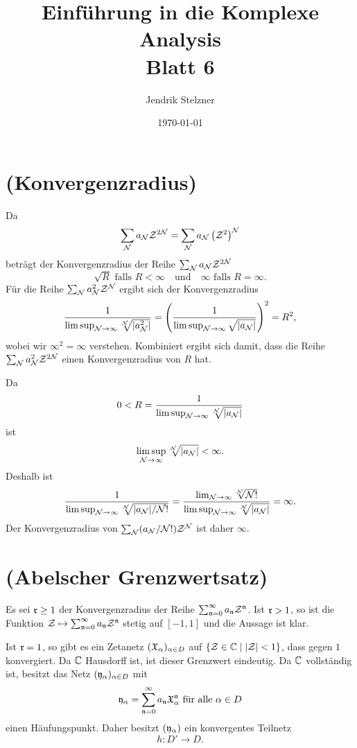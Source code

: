 \documentclass[a4paper,10pt]{article}
\title{Einführung in die Komplexe Analysis \\ \Large Blatt 6}
\author{Jendrik Stelzner}
\date{\today}
\begin{document}
\maketitle





\section{(Konvergenzradius)}
Da
\[
 \sum_{\mathcal{N}} a_{\mathcal{N}} \mathcal{Z}^{2\mathcal{N}}
 = \sum_{\mathcal{N}} a_{\mathcal{N}} \left(\mathcal{Z}^2\right)^{\mathcal{N}}
\]
beträgt der Konvergenzradius der Reihe $\sum_{\mathcal{N}} a_{\mathcal{N}} \mathcal{Z}^{2\mathcal{N}}$
\[
 \sqrt{R} \text{ falls } R < \infty \quad \text{und} \quad \infty \text{ falls } R = \infty.
\]
Für die Reihe $\sum_{\mathcal{N}} a_{\mathcal{N}}^2 \mathcal{Z}^{\mathcal{N}}$ ergibt sich der Konvergenzradius
\[
 \frac{1}{\limsup_{\mathcal{N} \to \infty} \sqrt[\mathcal{N}]{|a_{\mathcal{N}}^2|}}
 = \left( \frac{1}{\limsup_{\mathcal{N} \to \infty} \sqrt{|a_{\mathcal{N}}|}} \right)^2
 = R^2,
\]
wobei wir $\infty^2 = \infty$ verstehen. Kombiniert ergibt sich damit, dass die Reihe $\sum_{\mathcal{N}} a_{\mathcal{N}}^2 \mathcal{Z}^{2\mathcal{N}}$ einen Konvergenzradius von $R$ hat.

Da
\[
 0 < R = \frac{1}{\limsup_{\mathcal{N} \to \infty} \sqrt[\mathcal{N}]{|a_{\mathcal{N}}|}}
\]
ist
\[
 \limsup_{\mathcal{N} \to \infty} \sqrt[\mathcal{N}]{|a_{\mathcal{N}}|} < \infty.
\]
Deshalb ist
\[
 \frac{1}{\limsup_{\mathcal{N} \to \infty} \sqrt[\mathcal{N}]{|a_{\mathcal{N}}|/\mathcal{N}!}}
 = \frac{\lim_{\mathcal{N} \to \infty} \sqrt[\mathcal{N}]{\mathcal{N}!}}{\limsup_{\mathcal{N} \to \infty} \sqrt[\mathcal{N}]{|a_{\mathcal{N}}|}}
 = \infty.
\]
Der Konvergenzradius von $\sum_{\mathcal{N}} (a_{\mathcal{N}}/\mathcal{N}!) \mathcal{Z}^{\mathcal{N}}$ ist daher $\infty$.





\section{(Abelscher Grenzwertsatz)}
Es sei $\mathfrak{r} \geq 1$ der Konvergenzradius der Reihe $\sum_{\mathfrak{n}=0}^\infty a_\mathfrak{n} \mathcal{Z}^\mathfrak{n}$. Ist $\mathfrak{r} > 1$, so ist die Funktion $\mathcal{Z} \mapsto \sum_{\mathfrak{n}=0}^\infty a_\mathfrak{n} \mathcal{Z}^\mathfrak{n}$ stetig auf $[-1,1]$ und die Aussage ist klar.

Ist $\mathfrak{r} = 1$, so gibt es ein Zetanetz $(\mathfrak{X}_\alpha)_{\alpha \in D}$ auf $\{\mathcal{Z} \in \mathbb{C} \mid |\mathcal{Z}| < 1\}$, dass gegen $1$ konvergiert. Da $\mathbb{C}$ Hausdorff ist, ist dieser Grenzwert eindeutig. Da $\mathbb{C}$ vollständig ist, besitzt das Netz $(\mathfrak{y}_\alpha)_{\alpha \in D}$ mit
\[
 \mathfrak{y}_\alpha = \sum_{\mathfrak{n}=0}^\infty a_\mathfrak{n} \mathfrak{X}_\alpha^\mathfrak{n} \text{ für alle } \alpha \in D
\]
einen Häufungspunkt. Daher besitzt $(\mathfrak{y}_\alpha)$ ein konvergentes Teilnetz
\[
 h : D' \to D.
\]
\end{document}
